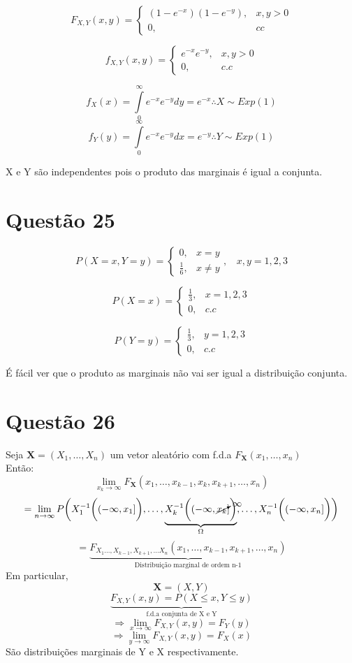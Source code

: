\documentclass[a4paper,12pt]{report}
\begin{document}
	$$F_{X,Y}(x,y) = \begin{cases}
	(1-e^{-x})(1-e^{-y}), & x,y>0\\
	0, & cc
	\end{cases} $$
	
	$$
	f_{X,Y}(x,y)=\begin{cases}
	e^{-x}	e^{-y}, & x,y > 0\\
	0, & c.c
	\end{cases}
	$$
	
	$$
	f_X(x) = \int\limits_0^\infty 	e^{-x}	e^{-y} dy = 	e^{-x}\therefore X \sim Exp(1)
	$$
		$$
	f_Y(y) = \int\limits_0^\infty 	e^{-x}	e^{-y} dx = 	e^{-y}\therefore Y \sim Exp(1)
	$$
	
	X e Y são independentes pois o produto das marginais é igual a conjunta.
		\section*{Questão 25}	 	
  $$P(X=x,Y=y)=\begin{cases}
			0, & x=y\\
			\frac{1}{6}, & x\ne y
			\end{cases}, \ \ \ \  x,y=1,2,3$$

		
		
		$$P(X=x)= \begin{cases}
		\frac{1}{3}, & x=1,2,3\\
		0, & c.c
		\end{cases} $$
		
			
		$$P(Y=y)= \begin{cases}
		\frac{1}{3}, & y=1,2,3\\
		0, & c.c
		\end{cases} $$
		
		É fácil ver que o produto as marginais não vai ser igual a distribuição conjunta.
		\newpage 
		\section*{Questão 26}
		Seja $\bm X=(X_1,\ldots,X_n )$ um vetor aleatório com f.d.a $F_{\bm X}(x_1,\ldots,x_n)$\\
		Então:
		$$\lim\limits_{x_k\rightarrow \infty}F_{\bm X}(x_1,\ldots,x_{k-1},x_k,x_{k+1},\ldots,x_n)$$
		$$ =
		\lim\limits_{n\rightarrow \infty} P\bigg(
		X_1^{-1}\bigg((-\infty,x_1]\bigg),\ldots, \underbrace{X_k^{-1}\bigg((-\infty,\cancelto{\infty}{x_k}]\bigg)}_{\Omega},\ldots, X_n^{-1}\bigg((-\infty,x_n]\bigg)
		\bigg)$$
		$$= \underbrace{F_{X_1\ldots,X_{k-1},X_{k+1},\ldots X_n}(x_1,\ldots,x_{k-1},x_{k+1},\ldots,x_n)}_{\text{Distribuição marginal de ordem n-1}} $$ 
		Em particular,
		$$\bm X=(X,Y) $$
		$$ \underbrace{F_{X,Y}(x,y) = P(X\le  x,Y\le y)}_{\text{f.d.a conjunta de X e Y}} $$
		$$\Rightarrow \lim\limits_{x\rightarrow \infty} F_{X,Y}(x,y)=F_Y(y) $$
		$$\Rightarrow \lim\limits_{y\rightarrow \infty} F_{X,Y}(x,y)=F_X(x) $$
		São distribuições marginais de Y e X respectivamente.
		
\end{document}
